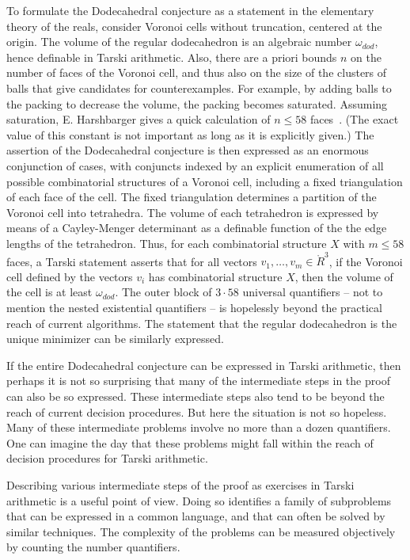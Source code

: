 \documentclass{article} %
\begin{document}
To formulate the Dodecahedral conjecture as a statement in the
elementary theory of the reals, consider Voronoi cells without
truncation, centered at the origin. The volume of the regular
dodecahedron is an algebraic number $\omega_{dod}$, hence definable in
Tarski arithmetic. Also, there are a priori bounds $n$ on the number
of faces of the Voronoi cell, and thus also on the size of the
clusters of balls that give candidates for counterexamples. For
example, by adding balls to the packing to decrease the volume, the
packing becomes saturated. Assuming saturation, E. Harshbarger gives a
quick calculation of $n\le58$ faces~\cite{website:HarsbargerVoronoi}.
(The exact value of this constant is not important as long as it is
explicitly given.) The assertion of the Dodecahedral conjecture is
then expressed as an enormous conjunction of cases, with conjuncts
indexed by an explicit enumeration of all possible combinatorial
structures of a Voronoi cell, including a fixed triangulation of each
face of the cell. The fixed triangulation determines a partition of
the Voronoi cell into tetrahedra. The volume of each tetrahedron is
expressed by means of a Cayley-Menger determinant as a definable
function of the the edge lengths of the tetrahedron. Thus, for each
combinatorial structure $X$ with $m\le 58$ faces, a Tarski statement
asserts that for all vectors $v_1,\ldots,v_m\in\ring{R}^3$, if the
Voronoi cell defined by the vectors $v_i$ has combinatorial structure
$X$, then the volume of the cell is at least $\omega_{dod}$. The outer
block of $3\cdot 58$ universal quantifiers -- not to mention the
nested existential quantifiers -- is hopelessly beyond the practical
reach of current algorithms. The statement that the regular
dodecahedron is the unique minimizer can be similarly expressed.

If the entire Dodecahedral conjecture can be expressed
in Tarski arithmetic, then perhaps it is not so surprising that
many of the intermediate steps in the proof can also be so expressed.
These intermediate steps also tend to be beyond the reach of
current decision procedures.  
But here the situation is not so hopeless.  Many of these
intermediate problems involve no more than a dozen quantifiers.
One can imagine the day that these problems might fall within the
reach of decision procedures for Tarski arithmetic.

Describing various intermediate steps 
of the proof as exercises
in Tarski arithmetic is a useful point of view.  Doing so identifies
a family of subproblems that can be expressed in a common language,
and that can often be solved by similar techniques.  
The complexity of the
problems can be measured objectively by counting the number
quantifiers.
\end{document}

